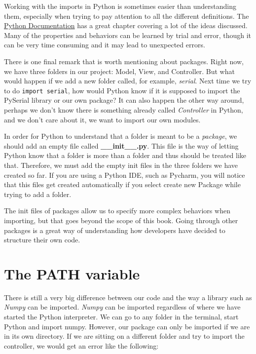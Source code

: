 Working with the imports in Python is sometimes easier than understanding them, especially when trying to pay attention to all the different definitions. The \href{https://docs.python.org/3.6/tutorial/modules.html}{Python Documentation} has a great chapter covering a lot of the ideas discussed. Many of the properties and behaviors can be learned by trial and error, though it can be very time consuming and it may lead to unexpected errors.

There is one final remark that is worth mentioning about packages. Right now, we have three folders in our project: Model, View, and Controller. But what would happen if we add a new folder called, for example, \emph{serial}. Next time we try to do \texttt{import serial}, how would Python know if it is supposed to import the PySerial library or our own package? It can also happen the other way around, perhaps we don't know there is something already called \emph{Controller} in Python, and we don't care about it, we want to import our own modules.

In order for Python to understand that a folder is meant to be a \emph{package}, we should add an empty file called \textbf{\_\_init\_\_.py}. This file is the way of letting Python know that a folder is more than a folder and thus should be treated like that. Therefore, we must add the empty init files in the three folders we have created so far. If you are using a Python IDE, such as Pycharm, you will notice that this files get created automatically if you select create new Package while trying to add a folder.


The init files of packages allow us to specify more complex behaviors when importing, but that goes beyond the scope of this book. Going through other packages is a great way of understanding how developers have decided to structure their own code.

\section{The PATH variable}\label{section:path}
There is still a very big difference between our code and the way a library such as \emph{Numpy} can be imported. \emph{Numpy} can be imported regardless of where we have started the Python interpreter. We can go to any folder in the terminal, start Python and import numpy. However, our package can only be imported if we are in its own directory. If we are sitting on a different folder and try to import the controller, we would get an error like the following:

